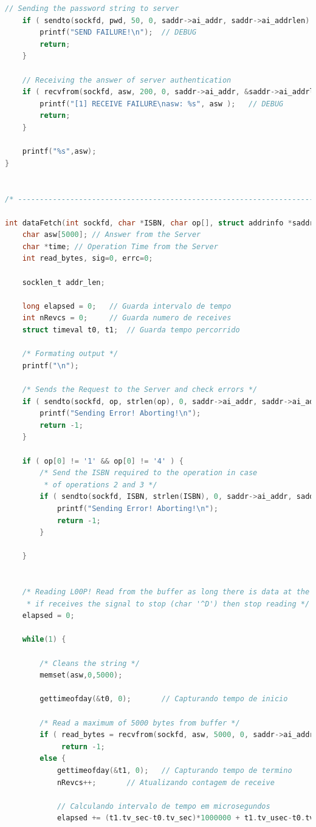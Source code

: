 \documentclass[10pt,a4paper]{report}
\begin{document}
\begin{lstlisting}[language=C]
	// Sending the password string to server
	if ( sendto(sockfd, pwd, 50, 0, saddr->ai_addr, saddr->ai_addrlen) < 0) {
		printf("SEND FAILURE!\n");	// DEBUG 
		return;
	}

	// Receiving the answer of server authentication
	if ( recvfrom(sockfd, asw, 200, 0, saddr->ai_addr, &saddr->ai_addrlen) < 0 ) {
		printf("[1] RECEIVE FAILURE\nasw: %s", asw );	// DEBUG
		return;
	}

	printf("%s",asw);
}


/* -------------------------------------------------------------------------- */

int dataFetch(int sockfd, char *ISBN, char op[], struct addrinfo *saddr) {
	char asw[5000];	// Answer from the Server
	char *time;	// Operation Time from the Server
	int read_bytes, sig=0, errc=0;
	
	socklen_t addr_len;

	long elapsed = 0; 	// Guarda intervalo de tempo
	int nRevcs = 0;		// Guarda numero de receives
	struct timeval t0, t1;	// Guarda tempo percorrido

	/* Formating output */
	printf("\n");
	
	/* Sends the Request to the Server and check errors */
	if ( sendto(sockfd, op, strlen(op), 0, saddr->ai_addr, saddr->ai_addrlen) < 0 ) {
		printf("Sending Error! Aborting!\n");
		return -1;
	}

	if ( op[0] != '1' && op[0] != '4' ) {
		/* Send the ISBN required to the operation in case
		 * of operations 2 and 3 */
		if ( sendto(sockfd, ISBN, strlen(ISBN), 0, saddr->ai_addr, saddr->ai_addrlen) < 0 ) {
			printf("Sending Error! Aborting!\n");
			return -1;
		}

	}


	/* Reading L00P! Read from the buffer as long there is data at the buffer,
	 * if receives the signal to stop (char '^D') then stop reading */
	elapsed = 0;
	
	while(1) {

		/* Cleans the string */
		memset(asw,0,5000);

		gettimeofday(&t0, 0);		// Capturando tempo de inicio

		/* Read a maximum of 5000 bytes from buffer */
		if ( read_bytes = recvfrom(sockfd, asw, 5000, 0, saddr->ai_addr, &saddr->ai_addrlen) < 0 ) 
			 return -1;
		else {
			gettimeofday(&t1, 0);	// Capturando tempo de termino
			nRevcs++;		// Atualizando contagem de receive
			
			// Calculando intervalo de tempo em microsegundos
			elapsed += (t1.tv_sec-t0.tv_sec)*1000000 + t1.tv_usec-t0.tv_usec;


\end{lstlisting}
\end{document}
